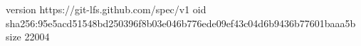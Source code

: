 version https://git-lfs.github.com/spec/v1
oid sha256:95e5acd51548bd250396f8b03e046b776ede09ef43c04d6b9436b77601baaa5b
size 22004
